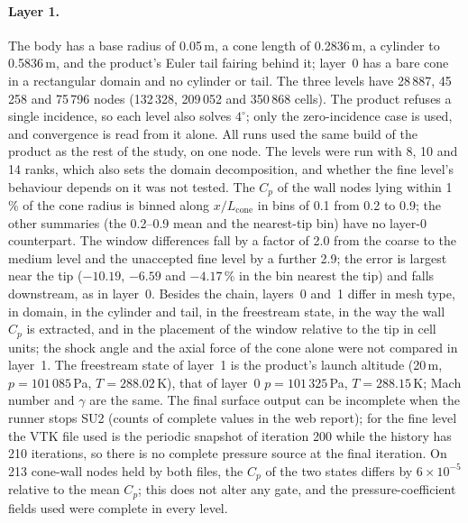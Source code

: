 \documentclass[twocolumn]{labreport}
\newcommand{\Cp}{C_p}
\begin{document}
\paragraph{Layer 1.}
The body has a base radius of 0.05\,m, a cone length of 0.2836\,m, a cylinder to 0.5836\,m, and the product's Euler tail fairing behind it; layer~0 has a bare cone in a rectangular domain and no cylinder or tail.
The three levels have 28\,887, 45\,258 and 75\,796 nodes (132\,328, 209\,052 and 350\,868 cells).
The product refuses a single incidence, so each level also solves $4^\circ$; only the zero-incidence case is used, and convergence is read from it alone.
All runs used the same build of the product as the rest of the study, on one node.
The levels were run with 8, 10 and 14 ranks, which also sets the domain decomposition, and whether the fine level's behaviour depends on it was not tested.
The $\Cp$ of the wall nodes lying within 1\,\% of the cone radius is binned along $x/L_\mathrm{cone}$ in bins of 0.1 from 0.2 to 0.9; the other summaries (the 0.2--0.9 mean and the nearest-tip bin) have no layer-0 counterpart.
The window differences fall by a factor of 2.0 from the coarse to the medium level and the unaccepted fine level by a further 2.9; the error is largest near the tip ($-10.19$, $-6.59$ and $-4.17\,\%$ in the bin nearest the tip) and falls downstream, as in layer~0.
Besides the chain, layers~0 and~1 differ in mesh type, in domain, in the cylinder and tail, in the freestream state, in the way the wall $\Cp$ is extracted, and in the placement of the window relative to the tip in cell units; the shock angle and the axial force of the cone alone were not compared in layer~1.
The freestream state of layer~1 is the product's launch altitude (20\,m, $p=101\,085$\,Pa, $T=288.02$\,K), that of layer~0 $p=101\,325$\,Pa, $T=288.15$\,K; Mach number and $\gamma$ are the same.
The final surface output can be incomplete when the runner stops SU2 (counts of complete values in the web report); for the fine level the VTK file used is the periodic snapshot of iteration 200 while the history has 210 iterations, so there is no complete pressure source at the final iteration.
On 213 cone-wall nodes held by both files, the $\Cp$ of the two states differs by $6\times10^{-5}$ relative to the mean $\Cp$; this does not alter any gate, and the pressure-coefficient fields used were complete in every level.
\end{document}
